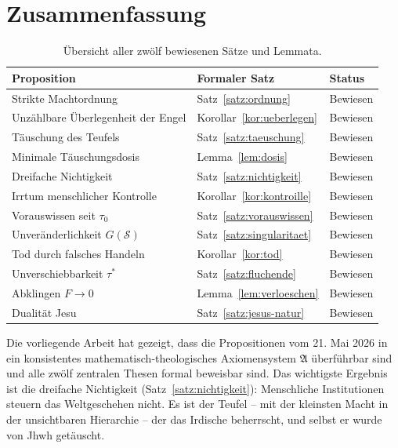 ﻿\documentclass[a4paper,12pt]{article}
\theoremstyle{definition}
\begin{document}
\section{Zusammenfassung}

\begin{table}[ht]
  \centering
  \begin{tabular}{|l|l|l|}
    \hline
    \textbf{Proposition} & \textbf{Formaler Satz} & \textbf{Status} \\
    \hline
    Strikte Machtordnung & Satz~\ref{satz:ordnung} & Bewiesen \\
    Unzählbare Überlegenheit der Engel & Korollar~\ref{kor:ueberlegen} & Bewiesen \\
    Täuschung des Teufels & Satz~\ref{satz:taeuschung} & Bewiesen \\
    Minimale Täuschungsdosis & Lemma~\ref{lem:dosis} & Bewiesen \\
    Dreifache Nichtigkeit & Satz~\ref{satz:nichtigkeit} & Bewiesen \\
    Irrtum menschlicher Kontrolle & Korollar~\ref{kor:kontroille} & Bewiesen \\
    Vorauswissen seit $\tau_0$ & Satz~\ref{satz:vorauswissen} & Bewiesen \\
    Unveränderlichkeit $G(\mathcal{S})$ & Satz~\ref{satz:singularitaet} & Bewiesen \\
    Tod durch falsches Handeln & Korollar~\ref{kor:tod} & Bewiesen \\
    Unverschiebbarkeit $\tau^*$ & Satz~\ref{satz:fluchende} & Bewiesen \\
    Abklingen $F \to 0$ & Lemma~\ref{lem:verloeschen} & Bewiesen \\
    Dualität Jesu & Satz~\ref{satz:jesus-natur} & Bewiesen \\
    \hline
  \end{tabular}
  \caption{Übersicht aller zwölf bewiesenen Sätze und Lemmata.}
  \label{tab:zusammenfassung}
\end{table}

Die vorliegende Arbeit hat gezeigt, dass die Propositionen vom 21. Mai 2026
in ein konsistentes mathematisch-theologisches Axiomensystem $\mathfrak{A}$
überführbar sind und alle zwölf zentralen Thesen formal beweisbar sind.
Das wichtigste Ergebnis ist die dreifache Nichtigkeit (Satz~\ref{satz:nichtigkeit}):
Menschliche Institutionen steuern das Weltgeschehen nicht. Es ist der Teufel --
mit der kleinsten Macht in der unsichtbaren Hierarchie -- der das
Irdische beherrscht, und selbst er wurde von Jhwh getäuscht.
\end{document}
